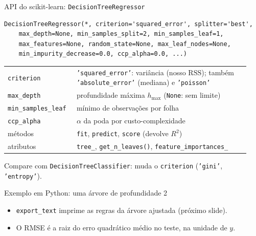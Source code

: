 \begin{frame}[fragile]{API do scikit-learn: \texttt{DecisionTreeRegressor}}
\begin{lstlisting}[style=py]
DecisionTreeRegressor(*, criterion='squared_error', splitter='best',
    max_depth=None, min_samples_split=2, min_samples_leaf=1,
    max_features=None, random_state=None, max_leaf_nodes=None,
    min_impurity_decrease=0.0, ccp_alpha=0.0, ...)
\end{lstlisting}
\vspace{2pt}
\footnotesize
\begin{tabular}{@{}p{0.26\linewidth}p{0.68\linewidth}@{}}
\toprule
\texttt{criterion} & \texttt{'squared\_error'}: variância (nosso $\mathrm{RSS}$); também \texttt{'absolute\_error'} (mediana) e \texttt{'poisson'}\\
\texttt{max\_depth} & profundidade máxima $h_{\max}$ (\texttt{None}: sem limite)\\
\texttt{min\_samples\_leaf} & mínimo de observações por folha\\
\texttt{ccp\_alpha} & $\alpha$ da poda por custo-complexidade\\
\midrule
métodos & \texttt{fit}, \texttt{predict}, \texttt{score} (devolve $R^2$)\\
atributos & \texttt{tree\_}, \texttt{get\_n\_leaves()}, \texttt{feature\_importances\_}\\
\bottomrule
\end{tabular}

\vspace{2pt}
{\scriptsize Compare com \texttt{DecisionTreeClassifier}: muda o \texttt{criterion} (\texttt{'gini'}, \texttt{'entropy'}).}
\end{frame}

\begin{frame}[fragile]{Exemplo em Python: uma árvore de profundidade 2}

\vspace{4pt}
\begin{itemize}
  \item \texttt{export\_text} imprime as regras da árvore ajustada (próximo slide).
  \item O RMSE é a raiz do erro quadrático médio no teste, na unidade de $y$.
\end{itemize}
\end{frame}

